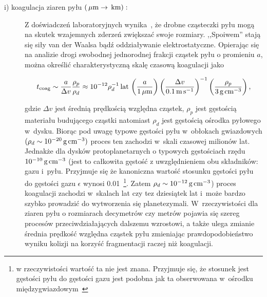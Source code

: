 \begin{description}
   \item[i) koagulacja ziaren pyłu $\left(\hbox{$\thinspace\mu\textrm{m}$} \rightarrow \hbox{$\thinspace\textrm{km}$}\right):$] 
      Z doświadczeń laboratoryjnych wynika~\cite{BW08}, że drob\-ne cząsteczki pyłu
      mogą na skutek wzajemnych zderzeń zwiększać swoje rozmiary. ,,Spoiwem'' stają
      się siły van der Waalsa bądź oddziaływanie elektrostatyczne. Opierając się
      na analizie drogi swobodnej jednorodnej frakcji cząstek pyłu o promieniu
      $a$, można określić charakterystyczną skalę czasową koagulacji jako 

   \begin{equation}\label{coag} 
      t_{\textrm{coag}} %
      \sim \frac{a}{\Delta v}\frac{\rho_p}{\rho_d} \approx 
      10^{-12} \rho_d^{-1}\yr\thinspace
      \left(\frac{a}{1\mum}\right)
      \left(\frac{\Delta v}{0.1\m\s^{-1}}\right)^{-1}
      \left(\frac{\rho_p}{3\g\cm^{-3}}\right),
   \end{equation}

   gdzie $\Delta v$ jest średnią prędkością względna cząstek, $\rho_p$ jest
   gęstością materiału budującego cząstki natomiast $\rho_d$ jest gęstością
   ośrodka pyłowego w~dysku.  Biorąc pod uwagę typowe gęstości pyłu w~obłokach
   gwiazdowych $(\rho_d \sim 10^{-20}\hbox{$\thinspace\textrm{g}$}\hbox{$\thinspace\textrm{cm}$}^{-3})$ proces ten zachodzi w~skali
   czasowej milionów lat. Jednakże dla dysków protoplanetarnych o typowych
   gęstościach rzędu $10^{-10}\hbox{$\thinspace\textrm{g}$}\hbox{$\thinspace\textrm{cm}$}^{-3}$ (jest to całkowita gęstość z
   uwzględnieniem obu składników: gazu i~pyłu. Przyjmuje się że kanoniczna
   wartość stosunku gęstości pyłu do gęstości gazu $\epsilon$ wynosi
   0.01~\footnote{w rzeczywistości wartość ta nie jest znana. Przyjmuje się, że
   stosunek jest gęstości pyłu do gęstości gazu jest podobna jak ta obserwowana
   w~ośrodku międzygwiazdowym~\cite{FS03}}. Zatem $\rho_d \sim
   10^{-12}\hbox{$\thinspace\textrm{g}$}\hbox{$\thinspace\textrm{cm}$}^{-3}$) proces koagulacji zachodzi w~skalach lat czy tez
   dziesiątek lat i~może bardzo szybko prowadzić do wytworzenia się
   planetezymali. W~rzeczywistości dla ziaren pyłu o rozmiarach decymetrów czy
   metrów pojawia się szereg procesów przeciwdziałających dalszemu wzrostowi, a
   także ulega zmianie średnia prędkość względna cząstek pyłu zmieniając
   prawdopodobieństwo wyniku kolizji na korzyść fragmentacji raczej niż
   koagulacji.  


\end{description}
